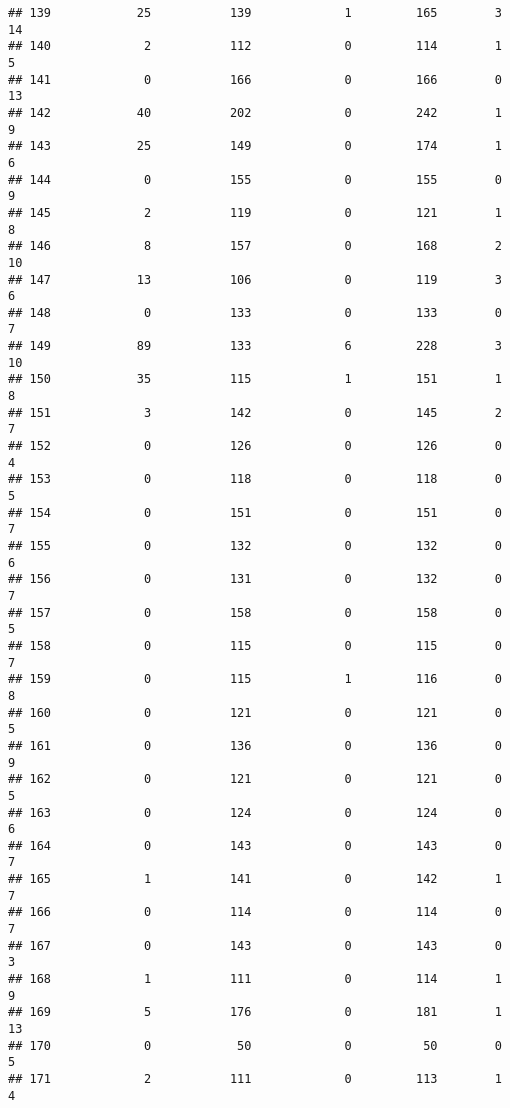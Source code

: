 \documentclass[]{article}
\begin{document}
\begin{verbatim}
## 139            25           139             1         165        3       14
## 140             2           112             0         114        1        5
## 141             0           166             0         166        0       13
## 142            40           202             0         242        1        9
## 143            25           149             0         174        1        6
## 144             0           155             0         155        0        9
## 145             2           119             0         121        1        8
## 146             8           157             0         168        2       10
## 147            13           106             0         119        3        6
## 148             0           133             0         133        0        7
## 149            89           133             6         228        3       10
## 150            35           115             1         151        1        8
## 151             3           142             0         145        2        7
## 152             0           126             0         126        0        4
## 153             0           118             0         118        0        5
## 154             0           151             0         151        0        7
## 155             0           132             0         132        0        6
## 156             0           131             0         132        0        7
## 157             0           158             0         158        0        5
## 158             0           115             0         115        0        7
## 159             0           115             1         116        0        8
## 160             0           121             0         121        0        5
## 161             0           136             0         136        0        9
## 162             0           121             0         121        0        5
## 163             0           124             0         124        0        6
## 164             0           143             0         143        0        7
## 165             1           141             0         142        1        7
## 166             0           114             0         114        0        7
## 167             0           143             0         143        0        3
## 168             1           111             0         114        1        9
## 169             5           176             0         181        1       13
## 170             0            50             0          50        0        5
## 171             2           111             0         113        1        4

\end{verbatim}
\end{document}
